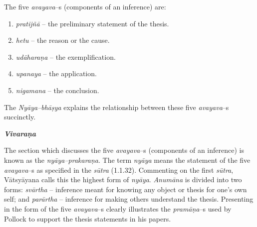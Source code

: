 \vspace{-.3cm}

The five \textit{avayava}–s (components of an inference) are:

\begin{enumerate}
\itemsep=0pt
\item \textit{pratijñā} – the preliminary statement of the thesis.

 \item \textit{hetu} – the reason or the cause.

 \item \textit{udāharaṇa} – the exemplification.

 \item \textit{upanaya} – the application.

 \item \textit{nigamana} – the conclusion.

\end{enumerate}

The \textit{Nyāya–bhāṣya} explains the relationship between these five \textit{avayava}–s succinctly.

\textit{\textbf{Vivaraṇa}}

The section which discusses the five \textit{avayava}–s (components of an inference) is known as the \textit{nyāya–prakaraṇa}. The term \textit{nyāya} means the statement of the five \textit{avayava}–s as specified in the \textit{sūtra} (1.1.32). Commenting on the first \textit{sūtra}, Vātsyāyana calls this the highest form of \textit{nyāya}. \textit{Anumāna} is divided into two forms: \textit{svārtha} – inference meant for knowing any object or thesis for one’s own self; and \textit{parārtha} – inference for making others understand the thesis. Presenting in the form of the five \textit{avayava}–s clearly illustrates the \textit{pramāṇa}–s used by Pollock to support the thesis statements in his papers.

